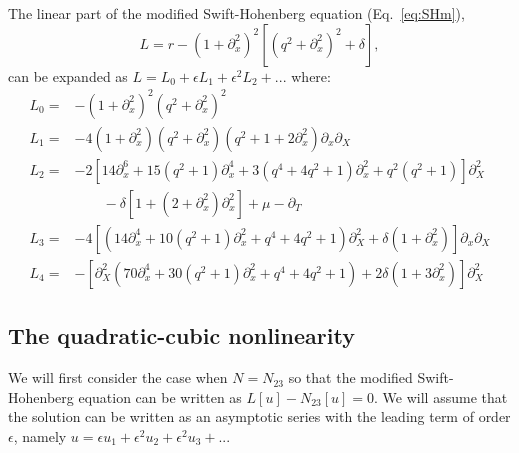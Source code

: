 \documentclass[api,pof,pre,12pt,a4paper]{revtex4-1}
\newcommand{\beqn}{\begin{equation}}
\newcommand{\eeqn}{\end{equation}}
\begin{document}
The linear part of the modified Swift-Hohenberg equation (Eq.~\ref{eq:SHm}), 
\beqn
L= r-\left(1+\partial_{x}^2\right)^2 \left[\left(q^2+\partial_{x}^2\right)^2+\delta \right],
\eeqn
can be expanded as $L=L_0+\epsilon L_1+\epsilon^2 L_2+...$ where:
\begin{subequations}
\begin{align}
L_0 =& -\left(1+\partial_x^2\right)^2 \left(q^2+\partial_x^2\right)^2 \\
L_1 =& -4\left(1+\partial_x^2\right)  \left(q^2+\partial_x^2\right) \left(q^2+1+2 \partial_x^2\right)\partial_x\partial_X \\
L_2 =&- 2 \left[14 \partial_x^6+15  \left(q^2+1\right)\partial_x^4+3 \left(q^4+4 q^2+1\right) \partial_x^2+q^2\left(q^2+1\right)\right] \partial_X^2\nonumber\\  
& \qquad -\delta \left[1+ \left(2+\partial_x^2\right)\partial_x^2\right] +\mu -\partial_T \\
L_3 =& -4   \left[ \left(14 \partial_x^4+10  \left(q^2+1\right)\partial_x^2+q^4+ 4 q^2+1\right)\partial_X^2+\delta\left(1 +\partial_x^2\right)\right]\partial_x \partial_X \\
L_4 =& -\left[\partial_X^2 \left(70 \partial_x^4+30\left(q^2+1\right) \partial_x^2 +q^4 +4 q^2+1\right)+2 \delta\left(1 +3 \partial_x^2 \right) \right] \partial_X^2  
\end{align}
\end{subequations}



\subsection{The quadratic-cubic nonlinearity}
We will first consider the case when $N=N_{23}$ so that the modified Swift-Hohenberg equation can be written as $L[u]-N_{23}[u]=0$.  We will assume that the solution can be written as an asymptotic series with the leading term of order $\epsilon$, namely $u=\epsilon u_1 + \epsilon^2 u_2 +\epsilon^2 u_3+...$ 
\end{document}
